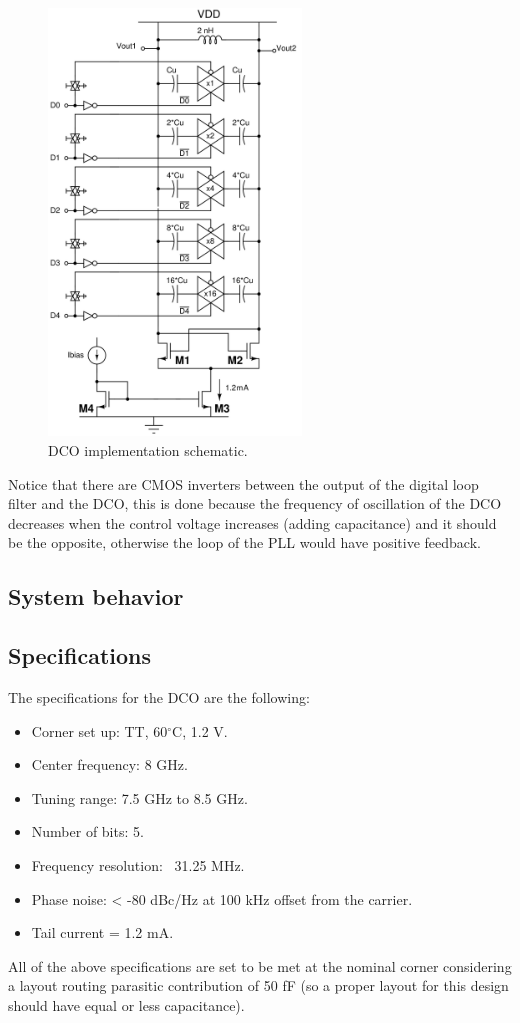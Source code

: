 \begin{figure}[H]
    \centering
    \includegraphics[width=0.6\textwidth]{figures/DCO_implementation.png}
    \caption{DCO implementation schematic.}
    \label{fig:DCO_implementation}
\end{figure}

Notice that there are CMOS inverters between the output of the digital loop filter and the DCO, this is done because the frequency of oscillation of the DCO decreases when the control voltage increases (adding 
capacitance) and it should be the opposite, otherwise the loop of the PLL would have positive feedback.

\subsection{System behavior}


\subsection{Specifications}
The specifications for the DCO are the following:
\begin{itemize}
    \item Corner set up: TT, 60$^{\circ}$C, 1.2 V.
    \item Center frequency: 8 GHz.
    \item Tuning range: 7.5 GHz to 8.5 GHz.
    \item Number of bits: 5.
    \item Frequency resolution: ~31.25 MHz.
    \item Phase noise: < -80 dBc/Hz at 100 kHz offset from the carrier.
    \item Tail current = 1.2 mA.
\end{itemize}
All of the above specifications are set to be met at the nominal corner considering a layout routing parasitic contribution of 50 fF (so a proper layout for this design should have equal or less capacitance). 


